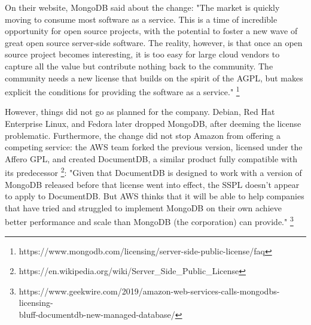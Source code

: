 \documentclass[12pt, a4paper]{article}
\begin{document}
  On their website, MongoDB said about the change: "The market is quickly moving to consume most software as a service. This is a time of incredible opportunity for open source projects, with the potential to foster a new wave of great open source server-side software. The reality, however, is that once an open source project becomes interesting, it is too easy for large cloud vendors to capture all the value but contribute nothing back to the community. The community needs a new license that builds on the spirit of the AGPL, but makes explicit the conditions for providing the software as a service." \footnote{https://www.mongodb.com/licensing/server-side-public-license/faq}

  However, things did not go as planned for the company. Debian, Red Hat Enterprise Linux, and Fedora later dropped MongoDB, after deeming the license problematic. Furthermore, the change did not stop Amazon from offering a competing service: the AWS team forked the previous version, licensed under the Affero GPL, and created DocumentDB, a similar product fully compatible with its predecessor \footnote{https://en.wikipedia.org/wiki/Server\_Side\_Public\_License}: "Given that DocumentDB is designed to work with a version of MongoDB released before that license went into effect, the SSPL doesn't appear to apply to DocumentDB. But AWS thinks that it will be able to help companies that have tried and struggled to implement MongoDB on their own achieve better performance and scale than MongoDB (the corporation) can provide." 
  \footnote{https://www.geekwire.com/2019/amazon-web-services-calls-mongodbs-licensing-\\bluff-documentdb-new-managed-database/}

\end{document}
